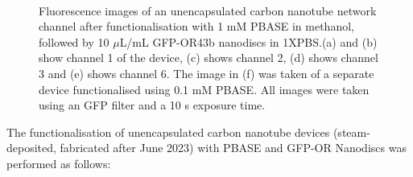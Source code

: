 \documentclass[
  a4paper,
]{scrbook}
\begin{document}
\begin{figure}
\begin{minipage}[t]{0.05\linewidth}
{\centering 

~

}

\end{minipage}%
%
\begin{minipage}[t]{0.47\linewidth}

{\centering 


}

\subcaption{\label{fig-PBASE-GFP-OR-0.1mM}}
\end{minipage}%

\caption{\label{fig-PBASE-GFP-ORs}Fluorescence images of an
unencapsulated carbon nanotube network channel after functionalisation
with 1 mM PBASE in methanol, followed by 10 \(\mu\)L/mL GFP-OR43b
nanodiscs in 1XPBS.(a) and (b) show channel 1 of the device, (c) shows
channel 2, (d) shows channel 3 and (e) shows channel 6. The image in (f)
was taken of a separate device functionalised using 0.1 mM PBASE. All
images were taken using an GFP filter and a 10 s exposure time.}

\end{figure}

The functionalisation of unencapsulated carbon nanotube devices
(steam-deposited, fabricated after June 2023) with PBASE and GFP-OR
Nanodiscs was performed as follows:
\end{document}
